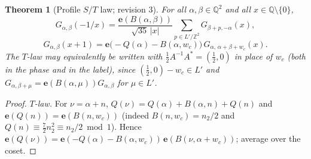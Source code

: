 \documentclass[11pt]{article}
\newtheorem{theorem}{Theorem}[section]
\theoremstyle{definition}
\theoremstyle{plain}
\newcommand{\Q}{\mathbb{Q}}
\newcommand{\Z}{\mathbb{Z}}
\newcommand{\e}{\mathbf{e}}
\begin{document}
\begin{theorem}[Profile $S/T$ law; revision 3]\label{thm:profile}
For all $\alpha,\beta\in\Q^2$ and all $x\in\Q\setminus\{0\}$,
\[
G_{\alpha,\beta}(-1/x)=\frac{\e(B(\alpha,\beta))}{\sqrt{35}\,|x|}\sum_{p\in L'/\Z^2}G_{\beta+p,-\alpha}(x),
\]
\[
G_{\alpha,\beta}(x+1)=\e\bigl(-Q(\alpha)-B(\alpha,w_c)\bigr)\,G_{\alpha,\,\alpha+\beta+w_c}(x).
\]
The $T$-law may equivalently be written with $\tfrac12A^{-1}A^*=(\tfrac12,0)$ in place of $w_c$ (both in the phase and in the label), since
$(\tfrac12,0)-w_c\in L'$ and $G_{\alpha,\beta+\mu}=\e(B(\alpha,\mu))G_{\alpha,\beta}$ for $\mu\in L'$.
\end{theorem}
\begin{proof}
\emph{$T$-law.} For $\nu=\alpha+n$, $Q(\nu)=Q(\alpha)+B(\alpha,n)+Q(n)$ and $\e(Q(n))=\e(B(n,w_c))$ (indeed $B(n,w_c)=n_2/2$ and
$Q(n)\equiv\tfrac72n_2^2\equiv n_2/2\bmod1$). Hence $\e(Q(\nu))=\e(-Q(\alpha)-B(\alpha,w_c))\,\e(B(\nu,\alpha+w_c))$; average over the coset.


\end{proof}
\end{document}
